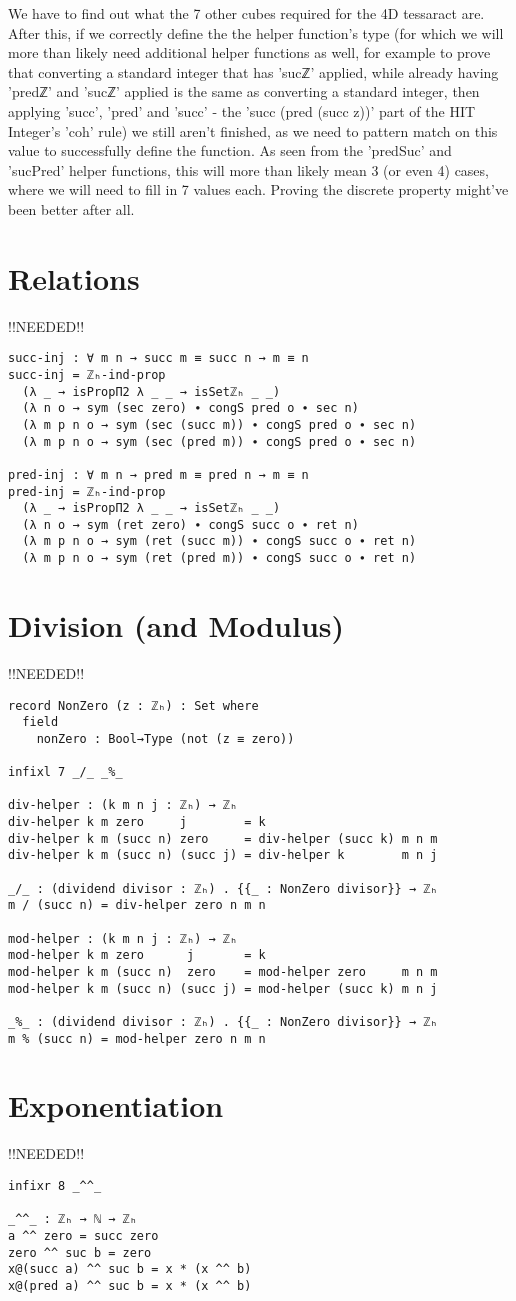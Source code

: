 We have to find out what the 7 other cubes required for the 4D tessaract are. After this, if we correctly define the the helper function's type (for which we will more than likely need additional helper functions as well, for example to prove that converting a standard integer that has 'sucℤ' applied, while already having 'predℤ' and 'sucℤ' applied is the same as converting a standard integer, then applying 'succ', 'pred' and 'succ' - the 'succ (pred (succ z))' part of the HIT Integer's 'coh' rule) we still aren't finished, as we need to pattern match on this value to successfully define the function. As seen from the 'predSuc' and 'sucPred' helper functions, this will more than likely mean 3 (or even 4) cases, where we will need to fill in 7 values each.
Proving the discrete property might've been better after all.

\section{Relations}
!!NEEDED!!
\begin{verbatim}
succ-inj : ∀ m n → succ m ≡ succ n → m ≡ n
succ-inj = ℤₕ-ind-prop
  (λ _ → isPropΠ2 λ _ _ → isSetℤₕ _ _)
  (λ n o → sym (sec zero) ∙ congS pred o ∙ sec n)
  (λ m p n o → sym (sec (succ m)) ∙ congS pred o ∙ sec n)
  (λ m p n o → sym (sec (pred m)) ∙ congS pred o ∙ sec n)

pred-inj : ∀ m n → pred m ≡ pred n → m ≡ n
pred-inj = ℤₕ-ind-prop
  (λ _ → isPropΠ2 λ _ _ → isSetℤₕ _ _)
  (λ n o → sym (ret zero) ∙ congS succ o ∙ ret n)
  (λ m p n o → sym (ret (succ m)) ∙ congS succ o ∙ ret n)
  (λ m p n o → sym (ret (pred m)) ∙ congS succ o ∙ ret n)
\end{verbatim}

\section{Division (and Modulus)}
!!NEEDED!!
\begin{verbatim}
record NonZero (z : ℤₕ) : Set where
  field
    nonZero : Bool→Type (not (z ≡ zero))

infixl 7 _/_ _%_

div-helper : (k m n j : ℤₕ) → ℤₕ
div-helper k m zero     j        = k
div-helper k m (succ n) zero     = div-helper (succ k) m n m
div-helper k m (succ n) (succ j) = div-helper k        m n j

_/_ : (dividend divisor : ℤₕ) . {{_ : NonZero divisor}} → ℤₕ
m / (succ n) = div-helper zero n m n

mod-helper : (k m n j : ℤₕ) → ℤₕ
mod-helper k m zero      j       = k
mod-helper k m (succ n)  zero    = mod-helper zero     m n m
mod-helper k m (succ n) (succ j) = mod-helper (succ k) m n j

_%_ : (dividend divisor : ℤₕ) . {{_ : NonZero divisor}} → ℤₕ
m % (succ n) = mod-helper zero n m n
\end{verbatim}

\section{Exponentiation}
!!NEEDED!!
\begin{verbatim}
infixr 8 _^^_

_^^_ : ℤₕ → ℕ → ℤₕ
a ^^ zero = succ zero
zero ^^ suc b = zero
x@(succ a) ^^ suc b = x * (x ^^ b)
x@(pred a) ^^ suc b = x * (x ^^ b)
\end{verbatim}

